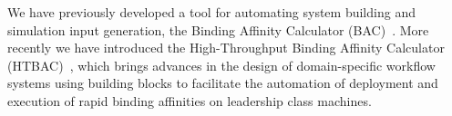 







We have previously developed a tool for automating
system building and simulation input generation, the Binding Affinity
Calculator (BAC)~\cite{Sadiq2008}. More recently we have introduced the 
High-Throughput Binding Affinity Calculator (HTBAC)~\cite{dakka2017}, 
which brings advances in the design of domain-specific workflow systems 
using building blocks to facilitate the automation of deployment 
and execution of rapid binding affinities on leadership class machines. 










